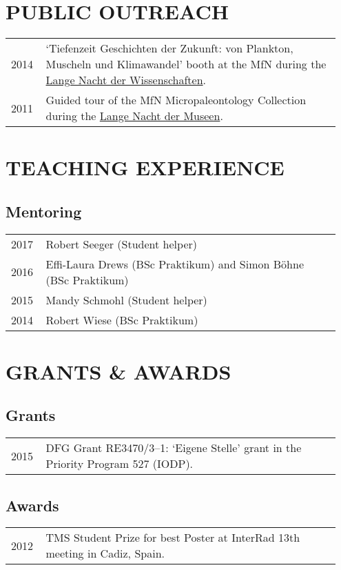 \documentclass[11pt, a4paper]{article}
\begin{document}
\section{PUBLIC OUTREACH}
\begin{longtable}{p{0.1\linewidth} P{0.85\linewidth}}
2014 & `Tiefenzeit Geschichten der Zukunft: von Plankton, Muscheln und Klimawandel' booth at the MfN during the \href{http://www.langenachtderwissenschaften.de/}{Lange Nacht der Wissenschaften}.\\
2011 & Guided tour of the MfN Micropaleontology Collection during the \href{http://www.lange-nacht-der-museen.de/}{Lange Nacht der Museen}.\\
\end{longtable}

\section{TEACHING EXPERIENCE}
\subsection{Mentoring}
\begin{longtable}{p{0.1\linewidth} P{0.85\linewidth}}
2017 & Robert Seeger (Student helper) \\
2016 & Effi-Laura Drews (BSc Praktikum) and Simon B\"{o}hne (BSc Praktikum) \\
2015 & Mandy Schmohl (Student helper) \\
2014 & Robert Wiese (BSc Praktikum) \\
\end{longtable}

\section{GRANTS \& AWARDS}
\subsection{Grants}
\begin{longtable}{p{0.1\linewidth} P{0.85\linewidth}}
2015 & DFG Grant RE3470/3--1: `Eigene Stelle' grant in the Priority Program 527 (IODP).\\
\end{longtable}
\subsection{Awards}
\begin{longtable}{p{0.1\linewidth} P{0.85\linewidth}}
2012 & TMS Student Prize for best Poster at InterRad 13th meeting in Cadiz, Spain.\\
\end{longtable}
\end{document}
